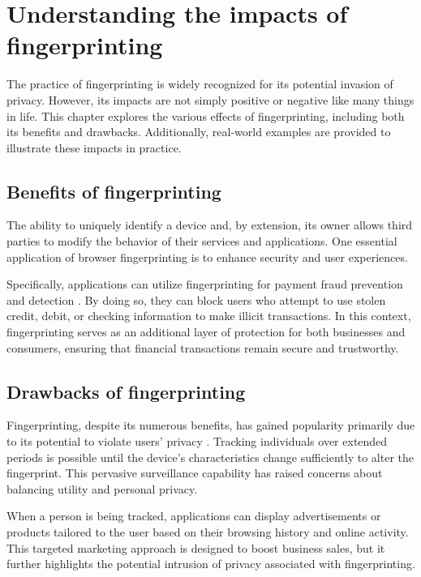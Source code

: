 \section{Understanding the impacts of fingerprinting}
\label{UnderstandingFingerprinting}

The practice of fingerprinting is widely recognized for its potential invasion of privacy. However, its impacts are not simply positive or negative like many things in life. This chapter explores the various effects of fingerprinting, including both its benefits and drawbacks. Additionally, real-world examples are provided to illustrate these impacts in practice.

\subsection{Benefits of fingerprinting}

The ability to uniquely identify a device and, by extension, its owner allows third parties to modify the behavior of their services and applications. One essential application of browser fingerprinting is to enhance security and user experiences.

Specifically, applications can utilize fingerprinting for payment fraud prevention and detection \cite{FingerprintJSUseCases}. By doing so, they can block users who attempt to use stolen credit, debit, or checking information to make illicit transactions. In this context, fingerprinting serves as an additional layer of protection for both businesses and consumers, ensuring that financial transactions remain secure and trustworthy.

\subsection{Drawbacks of fingerprinting}

Fingerprinting, despite its numerous benefits, has gained popularity primarily due to its potential to violate users' privacy \cite{WP224Fingerprinting}. Tracking individuals over extended periods is possible until the device's characteristics change sufficiently to alter the fingerprint. This pervasive surveillance capability has raised concerns about balancing utility and personal privacy.

When a person is being tracked, applications can display advertisements or products tailored to the user based on their browsing history and online activity. This targeted marketing approach is designed to boost business sales, but it further highlights the potential intrusion of privacy associated with fingerprinting.

